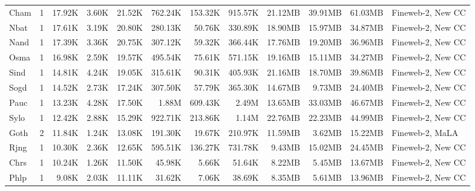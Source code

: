 \begin{table*}[!htp]
{\begin{tabular}{l|c|rrr|rrr|rrr|l}
Cham                    & 1                        & 17.92K   & 3.60K    & 21.52K  & 762.24K & 153.32K & 915.57K & 21.12MB  & 39.91MB  & 61.03MB  & Fineweb-2, New CC              \\
Nbat                    & 1                        & 17.61K   & 3.19K    & 20.80K  & 280.13K & 50.76K  & 330.89K & 18.90MB  & 15.97MB  & 34.87MB  & Fineweb-2, New CC              \\
Nand                    & 1                        & 17.39K   & 3.36K    & 20.75K  & 307.12K & 59.32K  & 366.44K & 17.76MB  & 19.20MB  & 36.96MB  & Fineweb-2, New CC              \\
Osma                    & 1                        & 16.98K   & 2.59K    & 19.57K  & 495.54K & 75.61K  & 571.15K & 19.16MB  & 15.11MB  & 34.27MB  & Fineweb-2, New CC              \\
Sind                    & 1                        & 14.81K   & 4.24K    & 19.05K  & 315.61K & 90.31K  & 405.93K & 21.16MB  & 18.70MB  & 39.86MB  & Fineweb-2, New CC              \\
Sogd                    & 1                        & 14.52K   & 2.73K    & 17.24K  & 307.50K & 57.79K  & 365.30K & 14.67MB  & 9.73MB   & 24.40MB  & Fineweb-2, New CC              \\
Pauc                    & 1                        & 13.23K   & 4.28K    & 17.50K  & 1.88M   & 609.43K & 2.49M   & 13.65MB  & 33.03MB  & 46.67MB  & Fineweb-2, New CC              \\
Sylo                    & 1                        & 12.42K   & 2.88K    & 15.29K  & 922.71K & 213.86K & 1.14M   & 22.76MB  & 22.23MB  & 44.99MB  & Fineweb-2, New CC              \\
Goth                    & 2                        & 11.84K   & 1.24K    & 13.08K  & 191.30K & 19.67K  & 210.97K & 11.59MB  & 3.62MB   & 15.22MB  & Fineweb-2, MaLA                \\
Rjng                    & 1                        & 10.30K   & 2.36K    & 12.65K  & 595.51K & 136.27K & 731.78K & 9.43MB   & 15.02MB  & 24.45MB  & Fineweb-2, New CC              \\
Chrs                    & 1                        & 10.24K   & 1.26K    & 11.50K  & 45.98K  & 5.66K   & 51.64K  & 8.22MB   & 5.45MB   & 13.67MB  & Fineweb-2, New CC              \\
Phlp                    & 1                        & 9.08K    & 2.03K    & 11.11K  & 31.62K  & 7.06K   & 38.69K  & 8.35MB   & 5.61MB   & 13.96MB  & Fineweb-2, New CC              \\

\end{tabular}}
\end{table*}
